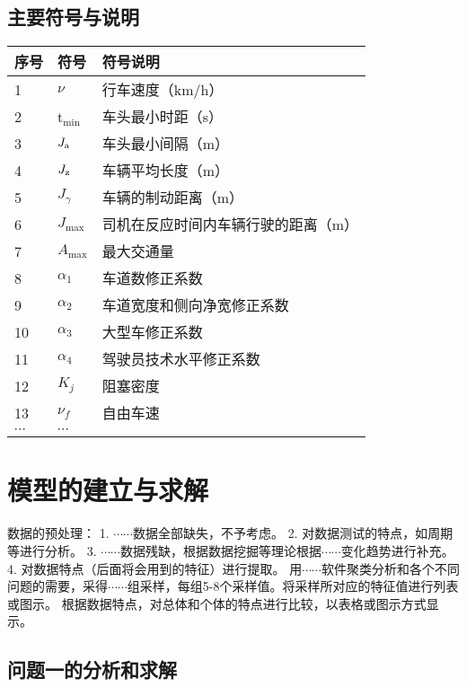 \documentclass[12pt,a4paper]{mcmthesis}
\newcommand{\headcol}{\rowcolor{tableheadcolor}}
\begin{document}
\subsection{主要符号与说明}

\begin{table}[h!]
  \centering
  \small
  \begin{tabular}{p{60pt}<{\centering}|p{60pt}<{\centering}p{180pt}<{\raggedright}}
   \hline
   \headcol 序号 & 符号 & 符号说明 \\
   \hline
    1 & $\nu$ & 行车速度（km/h） \\
    2 & t$_{\min}$ & 车头最小时距（s） \\
    3 & $J_{\rm a}$ & 车头最小间隔（m） \\
    4 & $J_{\rm z}$ & 车辆平均长度（m） \\
    5 & $J_{\gamma}$ & 车辆的制动距离（m） \\
    6 & $J_{\max}$ & 司机在反应时间内车辆行驶的距离（m） \\
    7 & $A_{\max}$ & 最大交通量 \\
    8 & $\alpha_{1}$ & 车道数修正系数 \\
    9 & $\alpha_{2}$ & 车道宽度和侧向净宽修正系数 \\
    10 & $\alpha_{3}$ & 大型车修正系数 \\
    11 & $\alpha_{4}$ & 驾驶员技术水平修正系数 \\
    12 & $K_{j}$ & 阻塞密度 \\
    13 & $\nu_{f}$ & 自由车速 \\
    $\cdots$ & $\cdots$\\
    \hline
  \end{tabular}
  \label{symbol}
\end{table}

\section{模型的建立与求解}

数据的预处理：
1. $\cdots\cdots$数据全部缺失，不予考虑。
2. 对数据测试的特点，如周期等进行分析。
3. $\cdots\cdots$数据残缺，根据数据挖掘等理论根据$\cdots\cdots$变化趋势进行补充。
4. 对数据特点（后面将会用到的特征）进行提取。
   用$\cdots\cdots$软件聚类分析和各个不同问题的需要，采得$\cdots\cdots$组采样，每组5-8个采样值。将采样所对应的特征值进行列表或图示。
根据数据特点，对总体和个体的特点进行比较，以表格或图示方式显示。


\subsection{问题一的分析和求解}
\end{document}
